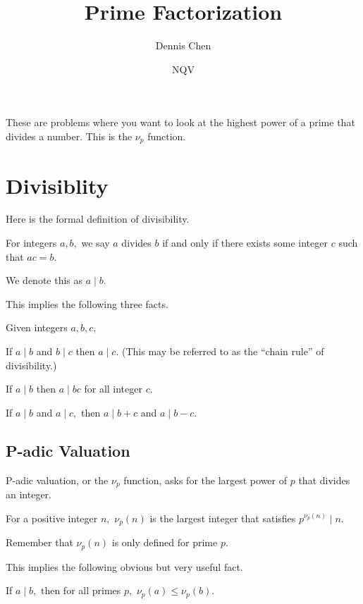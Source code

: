 \documentclass{article}
\title{Prime Factorization}
\author{Dennis Chen}
\date{NQV}
\begin{document}
\maketitle

These are problems where you want to look at the highest power of a prime that divides a number. This is the $\nu_p$ function.

\section{Divisiblity}

Here is the formal definition of divisibility.

\begin{defi}[Divisibility]
For integers $a,b,$ we say $a$ divides $b$ if and only if there exists some integer $c$ such that $ac=b.$

We denote this as $a\mid b.$ %
\end{defi}
This implies the following three facts.

\begin{fact}
Given integers $a,b,c,$
\begin{itemize}
    \Item If $a\mid b$ and $b\mid c$ then $a\mid c.$ (This may be referred to as the “chain rule” of divisibility.)
    
    \Item If $a\mid b$ then $a\mid bc$ for all integer $c.$
    
    \Item If $a\mid b$ and $a\mid c,$ then $a\mid b+c$ and $a\mid b-c.$
\end{itemize}
\end{fact}

\subsection{P-adic Valuation}

P-adic valuation, or the $\nu_p$ function, asks for the largest power of $p$ that divides an integer.

\begin{defi}
For a positive integer $n,$ $\nu_p(n)$ is the largest integer that satisfies $p^{\nu_p(n)}\mid n.$
\end{defi}

Remember that $\nu_p(n)$ is only defined for prime $p.$

This implies the following obvious but very useful fact.

\begin{fact}
If $a\mid b,$ then for all primes $p,$ $\nu_p(a)\leq \nu_p(b).$
\end{fact}
\end{document}
